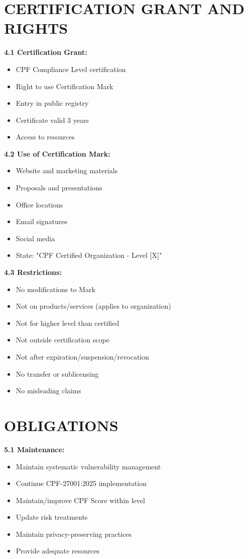 \documentclass[11pt,a4paper]{article}
\begin{document}
\section{CERTIFICATION GRANT AND RIGHTS}

\textbf{4.1 Certification Grant:}
\begin{itemize}
\item CPF Compliance Level certification
\item Right to use Certification Mark
\item Entry in public registry
\item Certificate valid 3 years
\item Access to resources
\end{itemize}

\textbf{4.2 Use of Certification Mark:}
\begin{itemize}
\item Website and marketing materials
\item Proposals and presentations
\item Office locations
\item Email signatures
\item Social media
\item State: "CPF Certified Organization - Level [X]"
\end{itemize}

\textbf{4.3 Restrictions:}
\begin{itemize}
\item No modifications to Mark
\item Not on products/services (applies to organization)
\item Not for higher level than certified
\item Not outside certification scope
\item Not after expiration/suspension/revocation
\item No transfer or sublicensing
\item No misleading claims
\end{itemize}

\section{OBLIGATIONS}

\textbf{5.1 Maintenance:}
\begin{itemize}
\item Maintain systematic vulnerability management
\item Continue CPF-27001:2025 implementation
\item Maintain/improve CPF Score within level
\item Update risk treatments
\item Maintain privacy-preserving practices
\item Provide adequate resources
\end{itemize}
\end{document}
